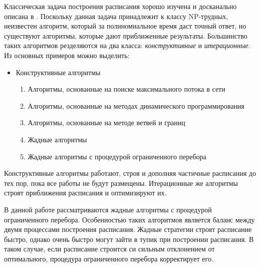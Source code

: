 Классическая задача построения расписания хорошо изучена и досканально описана в \cite{Coffman}. Поскольку данная задача принадлежит к классу NP-трудных, неизвестен алгоритм, который за полиномиальное время даст точный ответ, но существуют алгоритмы, которые дают приближенные результаты. Большинство таких алгоритмов резделяются на два класса: \textit{конструктивные} и \textit{итерационные}. Из основных примеров можно выделить:
\begin{itemize}
    \item Конструктивные алгоритмы
    \begin{enumerate}
        \item Алгоритмы, основанные на поиске максимального потока в сети
        \item Алгоритмы, основанные на методах динамического программирования
        \item Алгоритмы, основанные на методе ветвей и границ
        \item Жадные алгоритмы
        \item Жадные алгоритмы с процедурой ограниченного перебора
    \end{enumerate}
\end{itemize}
\par
Конструктивные алгоритмы работают, строя и дополняя частичные расписания до тех пор, пока все работы не будут размещены. Итерационные же алгоритмы строят приближения расписания и оптимизируют их.
\par
В данной работе рассматриваются жадные алгоритмы с процедурой ограниченного перебора. Особенностью таких алгоритмов является баланс между двумя процессами построения расписания. Жадные стратегии строят расписание быстро, однако очень быстро могут зайти в тупик при построении расписания. В таком случае, если расписание строится си сильным отклонением от оптимального, процедура ограниченного перебора корректирует его.